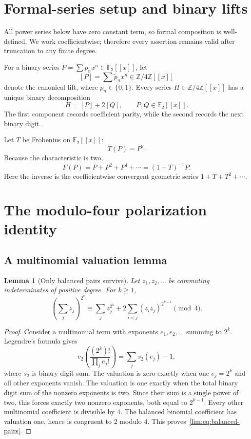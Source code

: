 \documentclass[11pt]{article}
\newtheorem{lemma}[theorem]{Lemma}
\theoremstyle{definition}
\theoremstyle{remark}
\newcommand{\Ftwo}{\mathbb F_2}
\newcommand{\Zfour}{\mathbb Z/4\mathbb Z}
\begin{document}
\section{Formal-series setup and binary lifts}

All power series below have zero constant term, so formal composition is
well-defined.  We work coefficientwise; therefore every assertion remains
valid after truncation to any finite degree.

For a binary series $P=\sum p_nx^n\in\Ftwo[[x]]$, let
\[
  [P]=\sum \widetilde p_nx^n\in\Zfour[[x]]
\]
denote the canonical lift, where $\widetilde p_n\in\{0,1\}$.  Every series
$H\in\Zfour[[x]]$ has a unique binary decomposition
\begin{equation}\label{lim:eq:binary-decomposition}
  H=[P]+2[Q],\qquad P,Q\in\Ftwo[[x]].
\end{equation}
The first component records coefficient parity, while the second records the
next binary digit.

Let $T$ be Frobenius on $\Ftwo[[x]]$:
\[
  T(P)=P^2.
\]
Because the characteristic is two,
\[
  F(P)=P+P^2+P^4+\cdots=(1+T)^{-1}P.
\]
Here the inverse is the coefficientwise convergent geometric series
$1+T+T^2+\cdots$.

\section{The modulo-four polarization identity}

\subsection{A multinomial valuation lemma}

\begin{lemma}[Only balanced pairs survive]
\label{lim:lem:balanced-pairs}
Let $z_1,z_2,\ldots$ be commuting indeterminates of positive degree.  For
$k\ge1$,
\begin{equation}\label{lim:eq:balanced-pairs}
 \left(\sum_j z_j\right)^{2^k}
 \equiv
 \sum_j z_j^{2^k}
 +2\sum_{i<j}(z_iz_j)^{2^{k-1}}
 \pmod4.
\end{equation}
\end{lemma}

\begin{proof}
Consider a multinomial term with exponents $e_1,e_2,\ldots$ summing to $2^k$.
Legendre's formula gives
\[
 v_2\!\left(\frac{(2^k)!}{\prod_j e_j!}\right)
 =\sum_j s_2(e_j)-1,
\]
where $s_2$ is binary digit sum.  The valuation is zero exactly when one
$e_j=2^k$ and all other exponents vanish.  The valuation is one exactly when
the total binary digit sum of the nonzero exponents is two.  Since their sum is
a single power of two, this forces exactly two nonzero exponents, both equal to
$2^{k-1}$.  Every other multinomial coefficient is divisible by $4$.
The balanced binomial coefficient has valuation one, hence is congruent to
$2$ modulo $4$.  This proves~\eqref{lim:eq:balanced-pairs}.
\end{proof}
\end{document}
